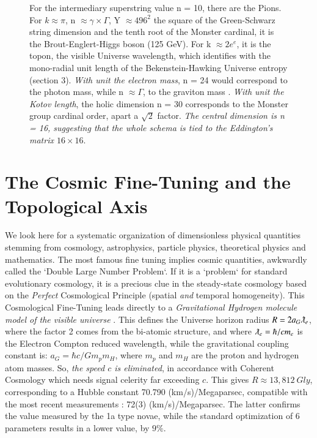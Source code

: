 \documentclass[twoside,draft]{article}
\begin{document}
\begin{sloppypar}
\begin{figure}
{    For the intermediary superstring value n = 10, there are the Pions. For $k \approx \pi$, n $\approx \gamma \times \Gamma$, Y $\approx 496^2$ 
    the square of the Green-Schwarz string dimension and the tenth root of the Monster cardinal, it is
    the Brout-Englert-Higgs boson (125 GeV). For k $\approx 2e^e$, it is the topon, the visible Universe wavelength,
    which identifies with the mono-radial unit length of the Bekenstein-Hawking Universe entropy (section 3).
   \textit{With unit the electron mass}, n = 24 would correspond to the photon mass, while n $\approx \Gamma$, 
    to the graviton mass \cite{sanchez1}.
    \textit{With unit the Kotov length}, the holic dimension n = 30 corresponds to the Monster group cardinal order, 
    apart a $\sqrt2$ factor.}
    \textit{The central dimension is n = 16, suggesting that the whole schema is tied to the Eddington's matrix $16 \times 16$}.
\label{fig:figure_label}
\end{figure}


\section {The Cosmic Fine-Tuning and the Topological Axis}

We look here for a systematic organization of dimensionless physical quantities stemming from cosmology, astrophysics, particle   physics, theoretical physics and mathematics. The most famous fine tuning implies cosmic quantities, awkwardly called the `Double Large Number Problem`. If it is a `problem` for standard evolutionary cosmology, it is a precious clue in the steady-state cosmology based on the \textit{Perfect} Cosmological Principle (spatial \textit{and} temporal homogeneity).
This Cosmological Fine-Tuning leads directly to a \textit{Gravitational Hydrogen molecule model of the visible universe} \cite{Sanchez1}.
This defines the Universe horizon radius $R = 2a_{G} \lambdabar_{e}$, where the factor 2 comes from the bi-atomic structure, and where $\lambdabar_{e} = \hbar/cm_{e}$ is the Electron Compton reduced wavelength, while the gravitational coupling constant is: $a_{G} = \hbar c/Gm_{p}m_{H}$, where $m_p$ and $m_H$ are the proton and hydrogen atom masses. So, \textit{the speed $c$ is eliminated}, in accordance with Coherent Cosmology which needs signal celerity far exceeding $c$. This gives $R \approx 13,812~Gly $, corresponding to a Hubble constant 70.790 (km/s)/Megaparsec, compatible with the most recent measurements \cite{Bonvin}: 72(3) (km/s)/Megaparsec. The latter confirms the value measured by the 1a type novae, while the standard optimization of 6 parameters results in a lower value, by $9\%$.


\end{sloppypar}
\end{document}

